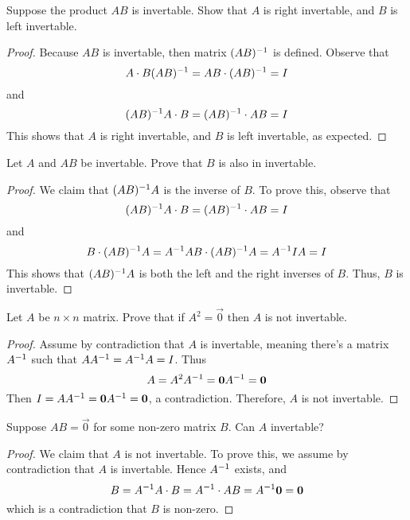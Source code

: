 \documentclass{article}
\def\by{\times}
\begin{document}
\begin{exercise}
  Suppose the product $AB$ is invertable. Show that $A$ is right 
  invertable, and $B$ is left invertable.
\end{exercise}
\begin{proof}
  Because $AB$ is invertable, then matrix $(AB)^{-1}$ is defined.
  Observe that
  \[ A\cdot B(AB)^{-1}=AB\cdot(AB)^{-1}=I \] and 
  \[ (AB)^{-1} A\cdot B=(AB)^{-1}\cdot AB=I\]
  This shows that $A$ is right invertable, and $B$ is left invertable,
  as expected.
\end{proof}
\begin{exercise}
  Let $A$ and $AB$ be invertable. Prove that $B$ is also in invertable.
\end{exercise}
\begin{proof}
  We claim that $(AB)^{-1} A$ is the inverse of $B$. To prove this,
  observe that 
  \[
    (AB)^{-1} A\cdot B=(AB)^{-1}\cdot AB=I
  \] and
  \[
    B\cdot (AB)^{-1} A=A^{-1} AB\cdot (AB)^{-1} A=A^{-1} IA=I
  \]
  This shows that $(AB)^{-1} A$ is both the left and the right inverses
  of $B$. Thus, $B$ is invertable.
\end{proof}
\begin{exercise}
  Let $A$ be $n\by n$ matrix. Prove that if $A^2=\vec{0}$ then 
  $A$ is not invertable.
\end{exercise}
\begin{proof}
  Assume by contradiction that $A$ is invertable, meaning there's a
  matrix $A^{-1}$ such that $AA^{-1}=A^{-1} A=I$. Thus
  \[
    A=A^2A^{-1}=\mathbf{0}A^{-1}=\mathbf{0}
  \]
  Then $I=AA^{-1}=\mathbf{0}A^{-1}=\mathbf{0}$, a contradiction. Therefore,
  $A$ is not invertable.
\end{proof}
\begin{exercise}
  Suppose $AB=\vec{0}$ for some non-zero matrix $B$. Can $A$ invertable?
\end{exercise}
\begin{proof}
  We claim that $A$ is not invertable. To prove this, we assume by
  contradiction that $A$ is invertable. Hence $A^{-1}$ exists, and
  \[
    B=A^{-1} A\cdot B=A^{-1}\cdot AB=A^{-1}\mathbf{0}=\mathbf{0}
  \]
  which is a contradiction that $B$ is non-zero.
\end{proof}
\end{document}
